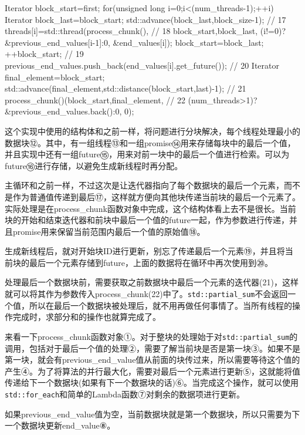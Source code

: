 \begin{cpp}
{  Iterator block_start=first;
  for(unsigned long i=0;i<(num_threads-1);++i)
  {
    Iterator block_last=block_start;
    std::advance(block_last,block_size-1);  // 17
    threads[i]=std::thread(process_chunk(),  // 18
                           block_start,block_last,
                           (i!=0)?&previous_end_values[i-1]:0,
                           &end_values[i]);
    block_start=block_last;
    ++block_start;  // 19
    previous_end_values.push_back(end_values[i].get_future());  // 20
  }
  Iterator final_element=block_start;
  std::advance(final_element,std::distance(block_start,last)-1);  // 21
  process_chunk()(block_start,final_element,  // 22
                  (num_threads>1)?&previous_end_values.back():0,
                  0);
}
\end{cpp}

这个实现中使用的结构体和之前一样，将问题进行分块解决，每个线程处理最小的数据块⑫。其中，有一组线程⑬和一组promise⑭用来存储每块中的最后一个值，并且实现中还有一组future⑮，用来对前一块中的最后一个值进行检索。可以为future⑯进行存储，以避免生成新线程时再分配。

主循环和之前一样，不过这次是让迭代器指向了每个数据块的最后一个元素，而不是作为普通值传递到最后⑰，这样就方便向其他块传递当前块的最后一个元素了。实际处理是在process\_chunk函数对象中完成，这个结构体看上去不是很长。当前块的开始和结束迭代器和前块中最后一个值的future一起，作为参数进行传递，并且promise用来保留当前范围内最后一个值的原始值⑱。

生成新线程后，就对开始块ID进行更新，别忘了传递最后一个元素⑲，并且将当前块的最后一个元素存储到future，上面的数据将在循环中再次使用到⑳。

处理最后一个数据块前，需要获取之前数据块中最后一个元素的迭代器(21)，这样就可以将其作为参数传入process\_chunk(22)中了。\texttt{std::partial\_sum}不会返回一个值，所以在最后一个数据块被处理后，就不用再做任何事情了。当所有线程的操作完成时，求部分和的操作也就算完成了。

来看一下process\_chunk函数对象①。对于整块的处理始于对\texttt{std::partial\_sum}的调用，包括对于最后一个值的处理②，需要了解当前块是否是第一块③。如果不是第一块，就会有previous\_end\_value值从前面的块传过来，所以需要等待这个值的产生④。为了将算法的并行最大化，需要对最后一个元素进行更新⑤，这就能将值传递给下一个数据块(如果有下一个数据块的话)⑥。当完成这个操作，就可以使用\texttt{std::for\_each}和简单的Lambda函数⑦对剩余的数据项进行更新。

如果previous\_end\_value值为空，当前数据块就是第一个数据块，所以只需要为下一个数据块更新end\_value⑧。

